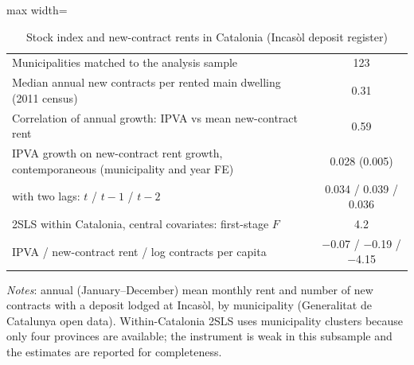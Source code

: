 \begin{table}[!htbp]\centering\small
\caption{Stock index and new-contract rents in Catalonia (Incasòl deposit register)}\label{tab:catalonia}
\begin{adjustbox}{max width=\linewidth}\begin{tabular}{lc}\toprule
Municipalities matched to the analysis sample & 123\\
Median annual new contracts per rented main dwelling (2011 census) & 0.31\\
Correlation of annual growth: IPVA vs mean new-contract rent & 0.59\\
IPVA growth on new-contract rent growth, contemporaneous (municipality and year FE) & 0.028 (0.005)\\
\quad with two lags: $t$ / $t-1$ / $t-2$ & 0.034 / 0.039 / 0.036\\
2SLS within Catalonia, central covariates: first-stage $F$ & 4.2\\
\quad IPVA / new-contract rent / log contracts per capita & $-$0.07 / $-$0.19 / $-$4.15\\
\bottomrule\end{tabular}\end{adjustbox}
\begin{minipage}{0.95\linewidth}\footnotesize\vspace{4pt}\textit{Notes}: annual (January--December) mean monthly rent and number of new contracts with a deposit lodged at Incasòl, by municipality (Generalitat de Catalunya open data). Within-Catalonia 2SLS uses municipality clusters because only four provinces are available; the instrument is weak in this subsample and the estimates are reported for completeness.\end{minipage}\end{table}